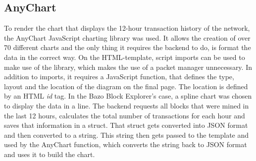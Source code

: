 \subsection{AnyChart} \label{chart}
To render the chart that displays the 12-hour transaction history of the network, the AnyChart JavaScript charting library \cite{anychart} was used. It allows the creation of over 70 different charts and the only thing it requires the backend to do, is format the data in the correct way. On the HTML-template, script imports can be used to make use of the library, which makes the use of a packet manager unnecessary. In addition to imports, it requires a JavaScript function, that defines the type, layout and the location of the diagram on the final page. The location is defined by an HTML \emph{id} tag. In the Bazo Block Explorer's case, a spline chart was chosen to display the data in a line.
The backend requests all blocks that were mined in the last 12 hours, calculates the total number of transactions for each hour and saves that information in a struct. That struct gets converted into JSON format and then converted to a string. This string then gets passed to the template and used by the AnyChart function, which converts the string back to JSON format and uses it to build the chart.

